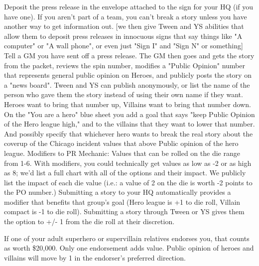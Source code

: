 \documentclass[green]{LRSguildcamp1}
\begin{document}
Deposit the press release in the envelope attached to the sign for your HQ (if you have one). If you aren't part of a team, you can't break a story unless you have another way to get information out.  [we then give Tween and YS abilities that allow them to deposit press releases in innocuous signs that say things like "A computer" or "A wall phone", or even just "Sign I" and "Sign N" or something]
Tell a GM you have sent off a press release.
The GM then goes and gets the story from the packet, reviews the spin number, modifies a "Public Opinion" number that represents general public opinion on Heroes, and publicly posts the story on a "news board". Tween and YS can publish anonymously, or list the name of the person who gave them the story instead of using their own name if they want. 
Heroes want to bring that number up, Villains want to bring that number down.  On the "You are a hero" blue sheet you add a goal that says "keep Public Opinion of the Hero league high," and to the villains that they want to lower that number.  And possibly specify that whichever hero wants to break the real story about the coverup of the Chicago incident values that above Public opinion of the hero league.
Modifiers to PR Mechanic:
Values that can be rolled on the die range from 1-6. With modifiers, you could technically get values as low as -2 or as high as 8; we'd list a full chart with all of the options and their impact. We publicly list the impact of each die value (i.e.: a value of 2 on the die is worth -2 points to the PO number.)
Submitting a story to your HQ automatically provides a modifier that benefits that group's goal (Hero league is +1 to die roll, Villain compact is -1 to die roll).
Submitting a story through Tween or YS gives them the option to +/- 1 from the die roll at their discretion.

If one of your adult superhero or supervillain relatives endorses you, that counts as worth \$20,000.  Only one endorsement adds value.
Public opinion of heroes and villains will move by 1 in the endorser's preferred direction.
\end{document}
